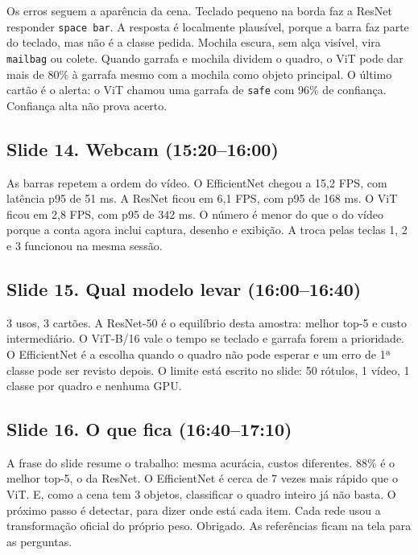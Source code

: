 \documentclass[12pt,a4paper]{article}
\begin{document}
Os erros seguem a aparência da cena. Teclado pequeno na borda faz a ResNet responder
\texttt{space bar}. A resposta é localmente plausível, porque a barra faz parte do teclado, mas
não é a classe pedida. Mochila escura, sem alça visível, vira \texttt{mailbag} ou colete. Quando
garrafa e mochila dividem o quadro, o ViT pode dar mais de 80\% à garrafa mesmo com a mochila
como objeto principal. O último cartão é o alerta: o ViT chamou uma garrafa de \texttt{safe} com
96\% de confiança. Confiança alta não prova acerto.

\subsection*{Slide 14. Webcam (15:20--16:00)}

As barras repetem a ordem do vídeo. O EfficientNet chegou a 15,2 FPS, com latência p95 de 51 ms.
A ResNet ficou em 6,1 FPS, com p95 de 168 ms. O ViT ficou em 2,8 FPS, com p95 de 342 ms. O número
é menor do que o do vídeo porque a conta agora inclui captura, desenho e exibição. A troca pelas
teclas 1, 2 e 3 funcionou na mesma sessão.

\subsection*{Slide 15. Qual modelo levar (16:00--16:40)}

3 usos, 3 cartões. A ResNet-50 é o equilíbrio desta amostra: melhor top-5 e custo intermediário.
O ViT-B/16 vale o tempo se teclado e garrafa forem a prioridade. O EfficientNet é a escolha quando
o quadro não pode esperar e um erro de 1ª classe pode ser revisto depois. O limite está escrito
no slide: 50 rótulos, 1 vídeo, 1 classe por quadro e nenhuma GPU.

\subsection*{Slide 16. O que fica (16:40--17:10)}

A frase do slide resume o trabalho: mesma acurácia, custos diferentes. 88\% é o melhor top-5, o da
ResNet. O EfficientNet é cerca de 7 vezes mais rápido que o ViT. E, como a cena tem 3 objetos,
classificar o quadro inteiro já não basta. O próximo passo é detectar, para dizer onde está cada
item. Cada rede usou a transformação oficial do próprio peso. Obrigado. As referências ficam na
tela para as perguntas.
\end{document}
